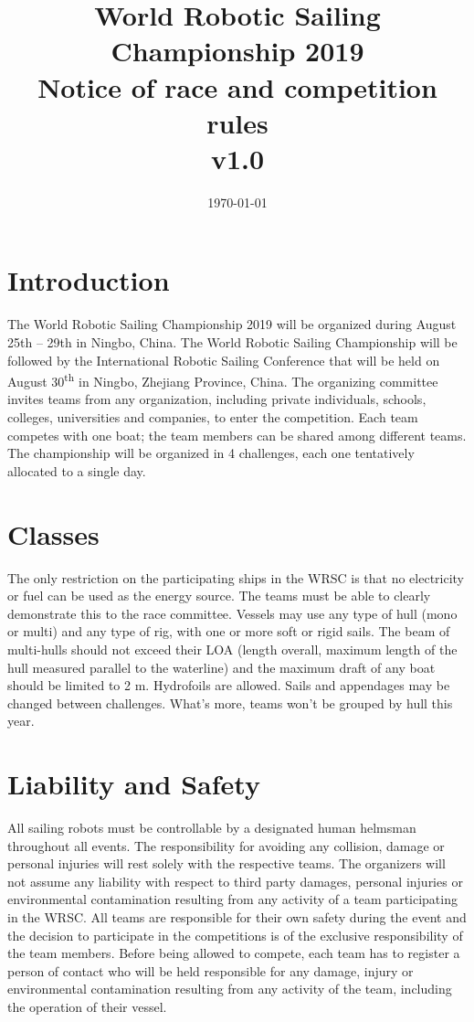 \documentclass[12pt]{article}
\title{World Robotic Sailing Championship 2019 \\
Notice of race and competition rules \\v1.0}
\date{\today}
\begin{document}
\maketitle

\section{Introduction}

The World Robotic Sailing Championship 2019 will be organized during August 25th – 29th in Ningbo, China.
The World Robotic Sailing Championship will be followed by the International Robotic Sailing Conference that will be held on August 30\textsuperscript{th} in Ningbo, Zhejiang Province, China.
The organizing committee invites teams from any organization, including private individuals, schools, colleges, universities and companies, to enter the competition.
Each team competes with one boat; the team members can be shared among different teams.
The championship will be organized in 4 challenges, each one tentatively allocated to a single day. 


\section{Classes}

The only restriction on the participating ships in the WRSC is that no electricity or fuel can be used as the energy source.
The teams must be able to clearly demonstrate this to the race committee.
Vessels may use any type of hull (mono or multi) and any type of rig, with one or more soft or rigid sails.
The beam of multi-hulls should not exceed their LOA (length overall, maximum length of the hull measured parallel to the waterline) and the maximum draft of any boat should be limited to 2 m.
Hydrofoils are allowed. 
Sails and appendages may be changed between challenges. 
What’s more, teams won’t be grouped by hull this year.

\section{Liability and Safety}
All sailing robots must be controllable by a designated human helmsman
throughout all events. The responsibility for avoiding any collision, 
damage or personal injuries will rest solely with the respective teams. 
The organizers will not assume any liability with respect to third party
damages, personal injuries or environmental contamination resulting from any
activity of a team participating in the WRSC. All teams are responsible for 
their own safety during the event and the decision to participate in the 
competitions is of the exclusive responsibility of the team members.
Before being allowed to compete, each team has to register a person of contact
who will be held responsible for any damage, injury or environmental
contamination resulting from any activity of the team, including the 
operation of their vessel.
\end{document}
